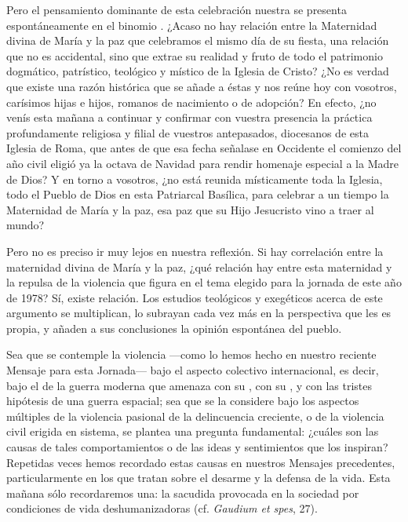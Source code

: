 \begin{body}
	Pero el pensamiento dominante de esta celebración nuestra se presenta espontáneamente en el binomio . ¿Acaso no hay relación entre la Maternidad divina de María y la paz que celebramos el mismo día de su fiesta, una relación que no es accidental, sino que extrae su realidad y fruto de todo el patrimonio dogmático, patrístico, teológico y místico de la Iglesia de Cristo? ¿No es verdad que existe una razón histórica que se añade a éstas y nos reúne hoy con vosotros, carísimos hijas e hijos, romanos de nacimiento o de adopción? En efecto, ¿no venís esta mañana a continuar y confirmar con vuestra presencia la práctica profundamente religiosa y filial de vuestros antepasados, diocesanos de esta Iglesia de Roma, que antes de que esa fecha señalase en Occidente el comienzo del año civil eligió ya la octava de Navidad para rendir homenaje especial a la Madre de Dios? Y en torno a vosotros, ¿no está reunida místicamente toda la Iglesia, todo el Pueblo de Dios en esta Patriarcal Basílica, para celebrar a un tiempo la Maternidad de María y la paz, esa paz que su Hijo Jesucristo vino a traer al mundo?
	
	Pero no es preciso ir muy lejos en nuestra reflexión. Si hay correlación entre la maternidad divina de María y la paz, ¿qué relación hay entre esta maternidad y la repulsa de la violencia que figura en el tema elegido para la jornada de este año de 1978? Sí, existe relación. Los estudios teológicos y exegéticos acerca de este argumento se multiplican, lo subrayan cada vez más en la perspectiva que les es propia, y añaden a sus conclusiones la opinión espontánea del pueblo.
	
	Sea que se contemple la violencia ---como lo hemos hecho en nuestro reciente Mensaje para esta Jornada--- bajo el aspecto colectivo internacional, es decir, bajo el de la guerra moderna que amenaza con su , con su , y con las tristes hipótesis de una guerra espacial; sea que se la considere bajo los aspectos múltiples de la violencia pasional de la delincuencia creciente, o de la violencia civil erigida en sistema, se plantea una pregunta fundamental: ¿cuáles son las causas de tales comportamientos o de las ideas y sentimientos que los inspiran? Repetidas veces hemos recordado estas causas en nuestros Mensajes precedentes, particularmente en los que tratan sobre el desarme y la defensa de la vida. Esta mañana sólo recordaremos una: la sacudida provocada en la sociedad por condiciones de vida deshumanizadoras (cf. \emph{Gaudium et spes}, 27).
	

\end{body}
